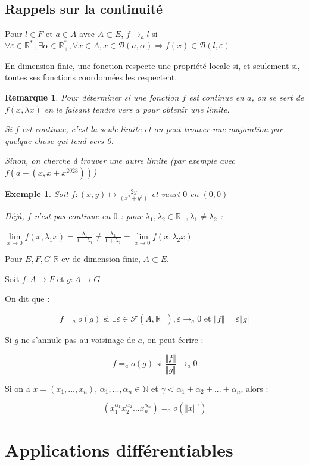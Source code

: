 \documentclass[a4paper,12pt]{book}
\newcommand{\Def}[2]{\begin{tcolorbox}[sharp corners, colback=white,colframe=blue!90!black!75, title=Définition : #1]#2\end{tcolorbox}}
\newcommand{\Prop}[2]{\begin{tcolorbox}[sharp corners, colback=white,colframe=red!90!black!75, title=Proposition : #1]#2\end{tcolorbox}}
\newtheorem{Exe}{Exemple}[section]
\newtheorem{Rem}{Remarque}[section]
\def\R{\mathbb{R}}
\def\N{\mathbb{N}}
\begin{document}
\subsection{Rappels sur la continuité}
\Def{Limite}{Pour $l\in F$ et $a\in\bar{A}$ avec $A\subset E$, $f\to_a l$ si $\forall \varepsilon\in\R_+^*, \exists \alpha\in \R_+^*, \forall x\in A, x\in\mathcal{B}(a,\alpha)\Rightarrow f(x)\in\mathcal{B}(l, \varepsilon)$}
\Prop{}{En dimension finie, une fonction respecte une propriété locale si, et seulement si, toutes ses fonctions coordonnées les respectent.}
\begin{Rem}
Pour déterminer si une fonction $f$ est continue en $a$, on se sert de $f(x, \lambda x)$ en le faisant tendre vers $a$ pour obtenir une limite.
\par Si $f$ est continue, c'est la seule limite et on peut trouver une majoration par quelque chose qui tend vers 0.
\par Sinon, on cherche à trouver une autre limite (par exemple avec $f(a - (x, x+x^{2023}))$)
\end{Rem}
\begin{Exe}
Soit $f:(x, y)\mapsto \frac{2y}{(x^2+y^2)}$ et vaurt $0$ en $(0,0)$
\par Déjà, $f$ n'est pas continue en $0$ : pour $\lambda_1,\lambda_2\in\R_+, \lambda_1\neq\lambda_2$ :
\par $\lim\limits_{x\to 0}f(x,\lambda_1 x) = \frac{\lambda_1}{1+\lambda_1}\neq\frac{\lambda_2}{1+\lambda_2}=\lim\limits_{x\to 0}f(x, \lambda_2x)$ 
\end{Exe}
\Def{o}{Pour $E, F, G$ $\R$-ev de dimension finie, $A\subset E$.
\par Soit $f:A\to F$ et $g:A\to G$
\par On dit que :
\par $$f =_a o(g)\text{ si } \exists\varepsilon\in\mathcal{F}(A,\R_+), \varepsilon\to_a 0 \text{ et } \Vert f\Vert =\varepsilon\Vert g\Vert$$
\par Si $g$ ne s'annule pas au voisinage de $a$, on peut écrire :
\par $$f =_a o(g)\text{ si }\frac{\Vert f\Vert}{\Vert g\Vert}\to_a 0$$}
\Prop{}{Si on a $x = (x_1,..., x_n)$, $\alpha_1,..., \alpha_n\in\N$ et $\gamma <\alpha_1+\alpha_2+...+\alpha_n$, alors :
\par $$(x_1^{\alpha_1} x_2^{\alpha_2}...x_n^{\alpha_n})=_0 o(\Vert x\Vert^\gamma)$$}


\section{Applications différentiables}
\end{document}
